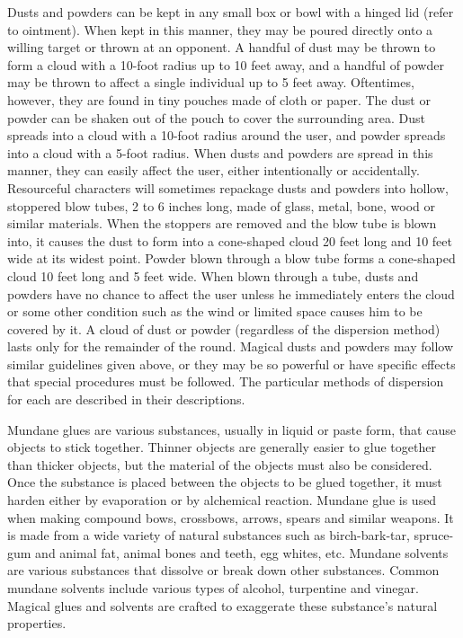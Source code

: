 \begin{multicols}{2}
Dusts and powders can be kept in any small box or bowl with a hinged lid (refer to ointment).  When kept in this manner, they may be poured directly onto a willing target or thrown at an opponent.  A handful of dust may be thrown to form a cloud with a 10-foot radius up to 10 feet away, and a handful of powder may be thrown to affect a single individual up to 5 feet away.  Oftentimes, however, they are found in tiny pouches made of cloth or paper.  The dust or powder can be shaken out of the pouch to cover the surrounding area.  Dust spreads into a cloud with a 10-foot radius around the user, and powder spreads into a cloud with a 5-foot radius.  When dusts and powders are spread in this manner, they can easily affect the user, either intentionally or accidentally.  Resourceful characters will sometimes repackage dusts and powders into hollow, stoppered blow tubes, 2 to 6 inches long, made of glass, metal, bone, wood or similar materials.  When the stoppers are removed and the blow tube is blown into, it causes the dust to form into a cone-shaped cloud 20 feet long and 10 feet wide at its widest point.  Powder blown through a blow tube forms a cone-shaped cloud 10 feet long and 5 feet wide.  When blown through a tube, dusts and powders have no chance to affect the user unless he immediately enters the cloud or some other condition such as the wind or limited space causes him to be covered by it.  A cloud of dust or powder (regardless of the dispersion method) lasts only for the remainder of the round.  Magical dusts and powders may follow similar guidelines given above, or they may be so powerful or have specific effects that special procedures must be followed.  The particular methods of dispersion for each are described in their descriptions.

Mundane glues are various substances, usually in liquid or paste form, that cause objects to stick together.  Thinner objects are generally easier to glue together than thicker objects, but the material of the objects must also be considered.  Once the substance is placed between the objects to be glued together, it must harden either by evaporation or by alchemical reaction.  Mundane glue is used when making compound bows, crossbows, arrows, spears and similar weapons.  It is made from a wide variety of natural substances such as birch-bark-tar, spruce-gum and animal fat, animal bones and teeth, egg whites, etc.  Mundane solvents are various substances that dissolve or break down other substances.  Common mundane solvents include various types of alcohol, turpentine and vinegar.  Magical glues and solvents are crafted to exaggerate these substance's natural properties.


\end{multicols}
